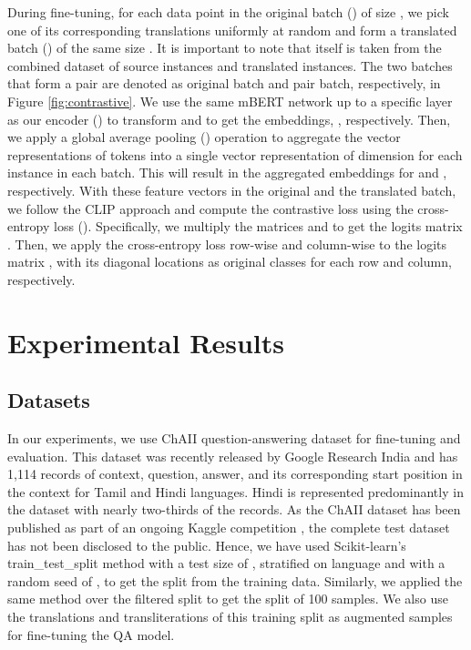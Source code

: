 \documentclass[11pt]{article}
\begin{document}
During fine-tuning, for each data point in the original batch () of size , we pick one of its corresponding translations uniformly at random and form a translated batch () of the same size . It is important to note that   itself is taken from the combined dataset of source instances and translated instances. The two batches that form a pair are denoted as original batch and pair batch, respectively, in Figure \ref{fig:contrastive}. We use the same mBERT network up to a specific layer as our encoder () to transform  and  to get the embeddings, , respectively. Then, we apply a global average pooling () operation to aggregate the vector representations of  tokens into a single vector representation of dimension  for each instance in each batch. This will result in the aggregated embeddings  for  and , respectively. With these  feature vectors in the original and the translated batch, we follow the CLIP \cite{radford2021learning} approach and compute the contrastive loss using the cross-entropy loss (). Specifically, we multiply the matrices  and  to get the logits matrix . Then, we apply the cross-entropy loss  row-wise and column-wise to the logits matrix , with its diagonal locations as original classes for each row and column, respectively.






\section{Experimental Results}

\subsection{Datasets}
In our experiments, we use ChAII \cite{ChAII} question-answering dataset for fine-tuning and evaluation. This dataset was recently released by Google Research India and has 1,114 records of context, question, answer, and its corresponding start position in the context for Tamil and Hindi languages. Hindi is represented predominantly in the dataset with nearly two-thirds of the records. As the ChAII dataset has been published as part of an ongoing Kaggle competition \cite{ChAII}, the complete test dataset has not been disclosed to the public. Hence, we have used Scikit-learn's train\_test\_split method with a test size of , stratified on language and with a random seed of , to get the  split from the training data. Similarly, we applied the same method over the filtered  split to get the  split of 100 samples. We also use the translations and transliterations of this training split as augmented samples for fine-tuning the QA model.
\end{document}
